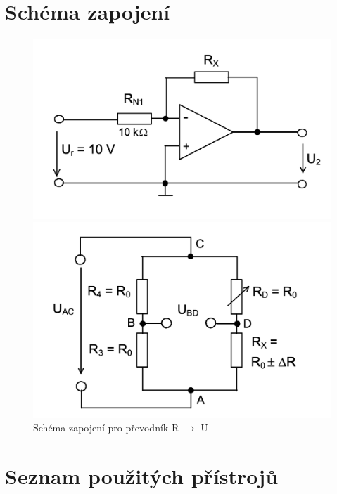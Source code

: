 \documentclass[a4paper,12pt]{article}   %
\begin{document}
\section{Schéma zapojení}
\label{chap:schema_zapojeni}
\begin{figure}[htbp]
  \centering
  \begin{minipage}{.4\textwidth}
    \captionsetup{width=\textwidth}
    \centering
    \includegraphics[width=\textwidth]{ru.png}
    \caption{Schéma zapojení pro převodník R $\rightarrow$ U}
    \label{fig:ru} 
  \end{minipage}
  \begin{minipage}{.4\textwidth}
    \captionsetup{width=.8\textwidth}
    \centering
    \includegraphics[width=\textwidth]{whu.png}
  \end{minipage}
\end{figure}




\section{Seznam použitých přístrojů}
\label{chap:seznam_pristroju}
\end{document}
